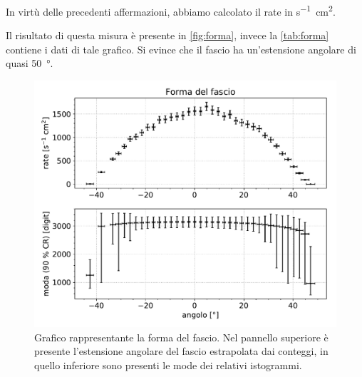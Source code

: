 In virtù delle precedenti affermazioni, abbiamo calcolato il rate in \si{s^{-1}cm^2}.

Il risultato di questa misura è presente in \autoref{fig:forma}, invece la \autoref{tab:forma} contiene i dati di tale grafico.
Si evince che il fascio ha un'estensione angolare di quasi \SI{50}{\degree}. 

\begin{figure}[h]
\centering
\includegraphics[width=30 em]{immagini/forma}
\caption{Grafico rappresentante la forma del fascio. Nel pannello superiore è presente l'estensione angolare del fascio estrapolata dai conteggi, in quello inferiore sono presenti le mode dei relativi istogrammi.}
\label{fig:forma}
\end{figure}

